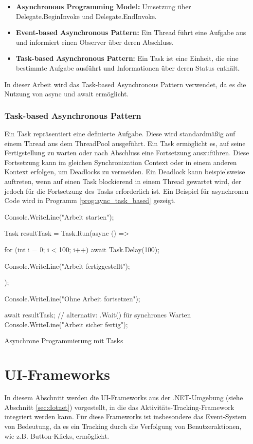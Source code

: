 \begin{itemize}
    \item \textbf{Asynchronous Programming Model:} Umsetzung über Delegate.BeginInvoke und Delegate.EndInvoke.
    \item \textbf{Event-based Asynchronous Pattern:} Ein Thread führt eine Aufgabe aus und informiert einen Observer über deren Abschluss.
    \item \textbf{Task-based Asynchronous Pattern:} Ein Task ist eine Einheit, die eine bestimmte Aufgabe ausführt und Informationen über deren Status enthält.
\end{itemize}

In dieser Arbeit wird das Task-based Asynchronous Pattern verwendet, da es die Nutzung von async und await ermöglicht.

\subsubsection{Task-based Asynchronous Pattern}
Ein Task \cite{Microsoft_TaskClass} repräsentiert eine definierte Aufgabe. Diese wird standardmäßig auf einem Thread aus dem ThreadPool ausgeführt. Ein Task ermöglicht es, auf seine Fertigstellung zu warten oder nach Abschluss eine Fortsetzung auszuführen. Diese Fortsetzung kann im gleichen Synchronization Context oder in einem anderen Kontext erfolgen, um Deadlocks zu vermeiden. Ein Deadlock kann beispielsweise auftreten, wenn auf einen Task blockierend in einem Thread gewartet wird, der jedoch für die Fortsetzung des Tasks erforderlich ist. Ein Beispiel für asynchronen Code wird in Programm \ref{prog:aync_task_based} gezeigt.

\begin{program}[H]
\begin{CsCode}
Console.WriteLine("Arbeit starten");

Task resultTask = Task.Run(async () =>
{
    for (int i = 0; i < 100; i++)
        await Task.Delay(100);

    Console.WriteLine("Arbeit fertiggestellt");
});

Console.WriteLine("Ohne Arbeit fortsetzen");

await resultTask; // alternativ: .Wait() für synchrones Warten
Console.WriteLine("Arbeit sicher fertig");
\end{CsCode}
\caption{Asynchrone Programmierung mit Tasks}
\label{prog:aync_task_based}
\end{program}

\section{UI-Frameworks}
\label{sec:ui_frameworks}
In diesem Abschnitt werden die UI-Frameworks aus der .NET-Umgebung (siehe Abschnitt \ref{sec:dotnet}) vorgestellt, in die das Aktivitäts-Tracking-Framework integriert werden kann. Für diese Frameworks ist insbesondere das Event-System von Bedeutung, da es ein Tracking durch die Verfolgung von Benutzeraktionen, wie z.B. Button-Klicks, ermöglicht.

